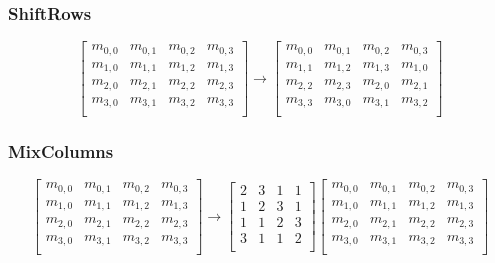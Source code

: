 \subsubsection{ShiftRows}
\[
\begin{bmatrix}
	m_{0,0}&m_{0,1}&m_{0,2}&m_{0,3}\\
	m_{1,0}&m_{1,1}&m_{1,2}&m_{1,3}\\
	m_{2,0}&m_{2,1}&m_{2,2}&m_{2,3}\\
	m_{3,0}&m_{3,1}&m_{3,2}&m_{3,3}\\
\end{bmatrix}
\rightarrow
\begin{bmatrix}
	m_{0,0}&m_{0,1}&m_{0,2}&m_{0,3}\\
	m_{1,1}&m_{1,2}&m_{1,3}&m_{1,0}\\
	m_{2,2}&m_{2,3}&m_{2,0}&m_{2,1}\\
	m_{3,3}&m_{3,0}&m_{3,1}&m_{3,2}\\
\end{bmatrix}
\]
\subsubsection{MixColumns}
\[
\begin{bmatrix}
	m_{0,0}&m_{0,1}&m_{0,2}&m_{0,3}\\
	m_{1,0}&m_{1,1}&m_{1,2}&m_{1,3}\\
	m_{2,0}&m_{2,1}&m_{2,2}&m_{2,3}\\
	m_{3,0}&m_{3,1}&m_{3,2}&m_{3,3}\\
\end{bmatrix}
\rightarrow
\begin{bmatrix}
	2&3&1&1\\
	1&2&3&1\\
	1&1&2&3\\	
	3&1&1&2\\
\end{bmatrix}
\begin{bmatrix}
	m_{0,0}&m_{0,1}&m_{0,2}&m_{0,3}\\
	m_{1,0}&m_{1,1}&m_{1,2}&m_{1,3}\\
	m_{2,0}&m_{2,1}&m_{2,2}&m_{2,3}\\
	m_{3,0}&m_{3,1}&m_{3,2}&m_{3,3}\\
\end{bmatrix}
\]
